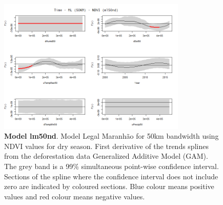 \begin{table}

\begin{figure}[H]
 \centering
        \centering
        \includegraphics[width=0.8\textwidth]{ml50nd.png} %
        \caption[Model Legal Maranhão for 50km bandwidth using NDVI values for dry season. First derivative of the trends splines from the deforestation data Generalized Additive Model (GAM)]{\textbf{Model lm50nd}. Model Legal Maranhão for 50km bandwidth using NDVI values for dry season. First derivative of the trends splines from the deforestation data Generalized Additive Model (GAM). The grey band is a 99\% simultaneous point-wise confidence interval. Sections of the spline where the confidence interval does not include zero are indicated by coloured sections. Blue colour means positive values and red colour means negative values.}
        \centering
\end{figure}
\end{table}

